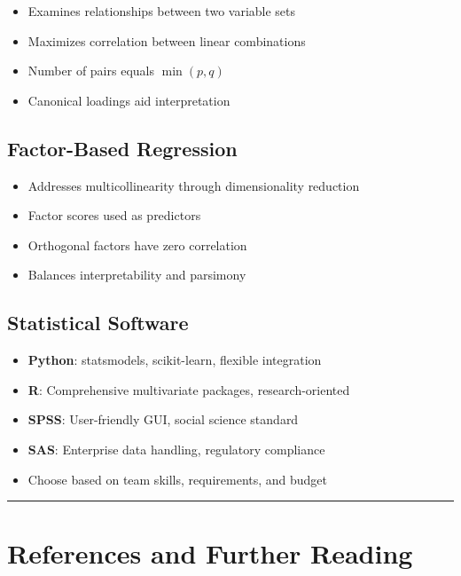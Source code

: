 \documentclass[
]{article}
\begin{document}
\begin{itemize}
\item
  Examines relationships between two variable sets
\item
  Maximizes correlation between linear combinations
\item
  Number of pairs equals \(\min(p,q)\)
\item
  Canonical loadings aid interpretation
\end{itemize}

\textbf{ }

\subsection{Factor-Based Regression}

\begin{itemize}
\item
  Addresses multicollinearity through dimensionality reduction
\item
  Factor scores used as predictors
\item
  Orthogonal factors have zero correlation
\item
  Balances interpretability and parsimony
\end{itemize}

\textbf{ }

\subsection{Statistical Software}

\begin{itemize}
\item
  \textbf{Python}: statsmodels, scikit-learn, flexible integration
\item
  \textbf{R}: Comprehensive multivariate packages, research-oriented
\item
  \textbf{SPSS}: User-friendly GUI, social science standard
\item
  \textbf{SAS}: Enterprise data handling, regulatory compliance
\item
  Choose based on team skills, requirements, and budget
\end{itemize}

\begin{center}\rule{0.5\linewidth}{0.5pt}\end{center}

\textbf{ }

\section{References and Further Reading}
\end{document}
